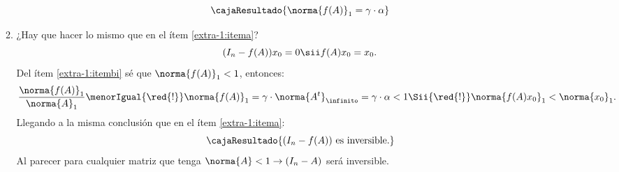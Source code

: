 \begin{enumerate}[label=(\alph*)]
\begin{enumerate}[label=\roman*)]
                $$
                  \cajaResultado{
                    \norma{f(A)}_1 = \gamma \cdot \alpha
                  }
                $$

          \item ¿Hay que hacer lo mismo que en el ítem \ref{extra-1:itema}?
                $$
                  (I_n - f(A))x_0 = 0
                  \sii
                  f(A)x_0 = x_0.
                $$
                Del ítem \ref{extra-1:itembi} sé que $\norma{f(A)}_1 < 1$, entonces:
                $$
                  \frac{\norma{f(A)}_1}{\norma{A}_1}
                  \menorIgual{\red{!}}
                  \norma{f(A)}_1 =
                  \gamma \cdot \norma{A^t}_\infinito =
                  \gamma \cdot \alpha < 1
                  \Sii{\red{!}}
                  \norma{f(A)x_0}_1 < \norma{x_0}_1.
                $$
                Llegando a la misma conclusión que en el ítem \ref{extra-1:itema}:
                $$
                  \cajaResultado{
                    (I_n - f(A))  \text{ es inversible.}
                  }
                $$
                Al parecer para cualquier matriz que tenga $\norma{A} < 1 \to (I_n - A)$ será inversible.

        \end{enumerate}

\end{enumerate}

\begin{aportes}
  \item {}
\end{aportes}

